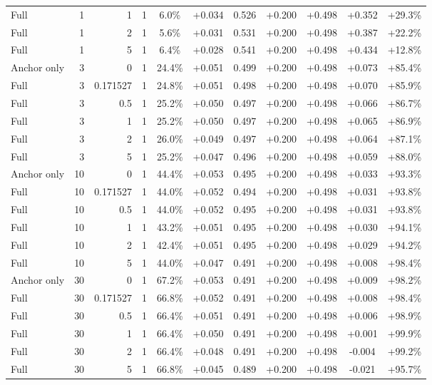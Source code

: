 \begin{table}[htbp]
\begin{tabular}{lrrrccccccc}
Full & 1 & 1 & 1 & 6.0\% & +0.034 & 0.526 & +0.200 & +0.498 & +0.352 & +29.3\% \\
Full & 1 & 2 & 1 & 5.6\% & +0.031 & 0.531 & +0.200 & +0.498 & +0.387 & +22.2\% \\
Full & 1 & 5 & 1 & 6.4\% & +0.028 & 0.541 & +0.200 & +0.498 & +0.434 & +12.8\% \\
Anchor only & 3 & 0 & 1 & 24.4\% & +0.051 & 0.499 & +0.200 & +0.498 & +0.073 & +85.4\% \\
Full & 3 & 0.171527 & 1 & 24.8\% & +0.051 & 0.498 & +0.200 & +0.498 & +0.070 & +85.9\% \\
Full & 3 & 0.5 & 1 & 25.2\% & +0.050 & 0.497 & +0.200 & +0.498 & +0.066 & +86.7\% \\
Full & 3 & 1 & 1 & 25.2\% & +0.050 & 0.497 & +0.200 & +0.498 & +0.065 & +86.9\% \\
Full & 3 & 2 & 1 & 26.0\% & +0.049 & 0.497 & +0.200 & +0.498 & +0.064 & +87.1\% \\
Full & 3 & 5 & 1 & 25.2\% & +0.047 & 0.496 & +0.200 & +0.498 & +0.059 & +88.0\% \\
Anchor only & 10 & 0 & 1 & 44.4\% & +0.053 & 0.495 & +0.200 & +0.498 & +0.033 & +93.3\% \\
Full & 10 & 0.171527 & 1 & 44.0\% & +0.052 & 0.494 & +0.200 & +0.498 & +0.031 & +93.8\% \\
Full & 10 & 0.5 & 1 & 44.0\% & +0.052 & 0.495 & +0.200 & +0.498 & +0.031 & +93.8\% \\
Full & 10 & 1 & 1 & 43.2\% & +0.051 & 0.495 & +0.200 & +0.498 & +0.030 & +94.1\% \\
Full & 10 & 2 & 1 & 42.4\% & +0.051 & 0.495 & +0.200 & +0.498 & +0.029 & +94.2\% \\
Full & 10 & 5 & 1 & 44.0\% & +0.047 & 0.491 & +0.200 & +0.498 & +0.008 & +98.4\% \\
Anchor only & 30 & 0 & 1 & 67.2\% & +0.053 & 0.491 & +0.200 & +0.498 & +0.009 & +98.2\% \\
Full & 30 & 0.171527 & 1 & 66.8\% & +0.052 & 0.491 & +0.200 & +0.498 & +0.008 & +98.4\% \\
Full & 30 & 0.5 & 1 & 66.4\% & +0.051 & 0.491 & +0.200 & +0.498 & +0.006 & +98.9\% \\
Full & 30 & 1 & 1 & 66.4\% & +0.050 & 0.491 & +0.200 & +0.498 & +0.001 & +99.9\% \\
Full & 30 & 2 & 1 & 66.4\% & +0.048 & 0.491 & +0.200 & +0.498 & -0.004 & +99.2\% \\
Full & 30 & 5 & 1 & 66.8\% & +0.045 & 0.489 & +0.200 & +0.498 & -0.021 & +95.7\% \\

\end{tabular}
\end{table}
